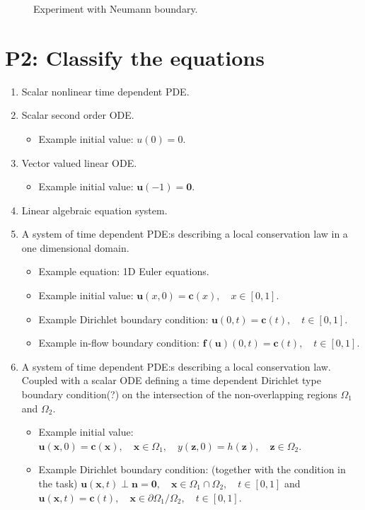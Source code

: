 \documentclass[12pt,a4paper]{report}
\begin{document}
\begin{figure}
	\centering
	
	\caption{Experiment with Neumann boundary.}
\end{figure}

\section*{P2: Classify the equations}
\begin{enumerate}[label=\alph*]
	\item Scalar nonlinear time dependent PDE.
	\item Scalar second order ODE.
	\begin{itemize}
		\item Example initial value: $u(0) = 0$.
	\end{itemize}
	\item Vector valued linear ODE.
	\begin{itemize}
	    \item Example initial value: $\mathbf{u}(-1) = \mathbf{0}$.
    \end{itemize}
	\item Linear algebraic equation system.
	\item A system of time dependent PDE:s describing a local conservation law in a one dimensional domain.
	\begin{itemize}
		\item Example equation: 1D Euler equations.
		\item Example initial value: $\mathbf{u}(x, 0) = \mathbf{c}(x), \quad x\in [0, 1]$.
		\item Example Dirichlet boundary condition: $\mathbf{u}(0, t) = \mathbf{c}(t), \quad t\in[0, 1]$.
		\item Example in-flow boundary condition: $\mathbf{f}(\mathbf{u})(0, t) = \mathbf{c}(t), \quad t\in[0, 1]$.
	\end{itemize}
		\item A system of time dependent PDE:s describing a local conservation law. Coupled with a scalar ODE defining a time dependent Dirichlet type boundary condition(?) on the intersection of the non-overlapping regions $\Omega_1$ and $\Omega_2$.
	\begin{itemize}
		\item Example initial value: $\mathbf{u}(\mathbf{x}, 0) = \mathbf{c}(\mathbf{x}), \quad \mathbf{x}\in \Omega_1, \quad y(\mathbf{z}, 0) = h(\mathbf{z}), \quad \mathbf{z} \in \Omega_2$.
		\item Example Dirichlet boundary condition: (together with the condition in the task) $\mathbf{u}(\mathbf{x}, t) \perp \mathbf{n} = \mathbf{0}, \quad \mathbf{x}\in\Omega_1 \cap \Omega_2, \quad t\in[0, 1]$ and $\mathbf{u}(\mathbf{x}, t) = \mathbf{c}(t), \quad \mathbf{x} \in \partial \Omega_1 / \Omega_2, \quad t\in[0, 1]$.
	\end{itemize}
\end{enumerate}


	
\end{document}
